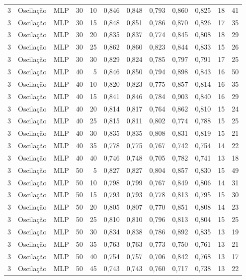 \begin{longtable}{ccclrrrrrrrr}
3 & Oscilação & MLP & 30 & 10 & 0,846 & 0,848 & 0,793 & 0,860 & 0,825 & 18 & 41 \\
3 & Oscilação & MLP & 30 & 15 & 0,848 & 0,851 & 0,786 & 0,870 & 0,826 & 17 & 35 \\
3 & Oscilação & MLP & 30 & 20 & 0,835 & 0,837 & 0,774 & 0,845 & 0,808 & 18 & 29 \\
3 & Oscilação & MLP & 30 & 25 & 0,862 & 0,860 & 0,823 & 0,844 & 0,833 & 15 & 26 \\
3 & Oscilação & MLP & 30 & 30 & 0,829 & 0,824 & 0,785 & 0,797 & 0,791 & 17 & 25 \\
3 & Oscilação & MLP & 40 & 5 & 0,846 & 0,850 & 0,794 & 0,898 & 0,843 & 16 & 50 \\
3 & Oscilação & MLP & 40 & 10 & 0,820 & 0,823 & 0,775 & 0,857 & 0,814 & 16 & 35 \\
3 & Oscilação & MLP & 40 & 15 & 0,841 & 0,846 & 0,784 & 0,903 & 0,840 & 16 & 29 \\
3 & Oscilação & MLP & 40 & 20 & 0,814 & 0,817 & 0,764 & 0,862 & 0,810 & 15 & 24 \\
3 & Oscilação & MLP & 40 & 25 & 0,815 & 0,811 & 0,802 & 0,774 & 0,788 & 15 & 25 \\
3 & Oscilação & MLP & 40 & 30 & 0,835 & 0,835 & 0,808 & 0,831 & 0,819 & 15 & 21 \\
3 & Oscilação & MLP & 40 & 35 & 0,778 & 0,775 & 0,767 & 0,742 & 0,754 & 14 & 22 \\
3 & Oscilação & MLP & 40 & 40 & 0,746 & 0,748 & 0,705 & 0,782 & 0,741 & 13 & 18 \\
3 & Oscilação & MLP & 50 & 5 & 0,827 & 0,827 & 0,804 & 0,857 & 0,830 & 15 & 49 \\
3 & Oscilação & MLP & 50 & 10 & 0,798 & 0,799 & 0,767 & 0,849 & 0,806 & 14 & 31 \\
3 & Oscilação & MLP & 50 & 15 & 0,793 & 0,793 & 0,778 & 0,813 & 0,795 & 15 & 30 \\
3 & Oscilação & MLP & 50 & 20 & 0,805 & 0,807 & 0,770 & 0,851 & 0,808 & 14 & 23 \\
3 & Oscilação & MLP & 50 & 25 & 0,810 & 0,810 & 0,796 & 0,813 & 0,804 & 15 & 25 \\
3 & Oscilação & MLP & 50 & 30 & 0,834 & 0,838 & 0,786 & 0,892 & 0,835 & 13 & 19 \\
3 & Oscilação & MLP & 50 & 35 & 0,763 & 0,763 & 0,773 & 0,750 & 0,761 & 13 & 21 \\
3 & Oscilação & MLP & 50 & 40 & 0,754 & 0,757 & 0,706 & 0,842 & 0,768 & 13 & 17 \\
3 & Oscilação & MLP & 50 & 45 & 0,743 & 0,743 & 0,760 & 0,717 & 0,738 & 13 & 22 \\

\end{longtable}
